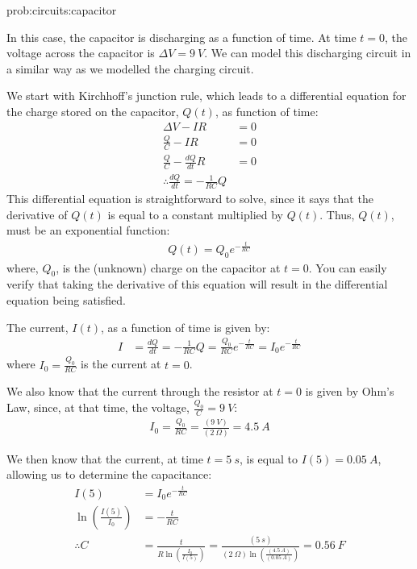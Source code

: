 \begin{solutionParts}{prob:circuits:capacitor}
{\label{soln:circuits:capacitor}
\item In this case, the capacitor is discharging as a function of time. At time $t=0$, the voltage across the capacitor is $\Delta V=\SI{9}{V}$. We can model this discharging circuit in a similar way as we modelled the charging circuit. 

We start with Kirchhoff's junction rule, which leads to a differential equation for the charge stored on the capacitor, $Q(t)$, as function of time:
\begin{align*}
\Delta V - IR &=0\\
\frac{Q}{C} - IR &=0\\
\frac{Q}{C} - \frac{dQ}{dt}R &=0\\
\therefore \frac{dQ}{dt} = -\frac{1}{RC}Q
\end{align*}
This differential equation is straightforward to solve, since it says that the derivative of $Q(t)$ is equal to a constant multiplied by $Q(t)$. Thus, $Q(t)$, must be an exponential function:
\begin{align*}
Q(t) = Q_0 e^{-\frac{t}{RC}}
\end{align*}
where, $Q_0$, is the (unknown) charge on the capacitor at $t=0$. You can easily verify that taking the derivative of this equation will result in the differential equation being satisfied. 

The current, $I(t)$, as a function of time is given by:
\begin{align*}
I &=\frac{dQ}{dt}=-\frac{1}{RC}Q=\frac{Q_0}{RC} e^{-\frac{t}{RC}}=I_0e^{-\frac{t}{RC}}
\end{align*}
where $I_0=\frac{Q_0}{RC}$ is the current at $t=0$.

We also know that the current through the resistor at $t=0$ is given by Ohm's Law, since, at that time, the voltage, $\frac{Q_0}{C}=\SI{9}{V}$:
\begin{align*}
I_0=\frac{Q_0}{RC}=\frac{(\SI{9}{V})}{(\SI{2}{\Omega})}=\SI{4.5}{A}
\end{align*}

We then know that the current, at time $t=\SI{5}{s}$, is equal to $I(5)=\SI{0.05}{A}$, allowing us to determine the capacitance:
\begin{align*}
I(5)&=I_0e^{-\frac{t}{RC}}\\
\ln\left( \frac{I(5)}{I_0} \right)&=-\frac{t}{RC}\\
\therefore C&=\frac{t}{R \ln\left( \frac{I_0}{I(5)} \right)}=\frac{(\SI{5}{s})}{(\SI{2}{\Omega})\ln\left( \frac{(\SI{4.5}{A})}{(\SI{0.05}{A})} \right)}=\SI{0.56}{F}
\end{align*}

}
\end{solutionParts}
